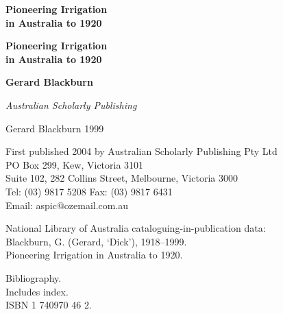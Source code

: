 \documentclass[11pt,b5paper,titlepage]{book}
\newcommand{\clearemptydoublepage}{\newpage{\pagestyle{empty}\cleardoublepage}}
\begin{document}
\frontmatter

\begin{titlepage}
\pagestyle{empty}

\begin{center}

\vspace*{60mm}

{\bfseries\sffamily\Huge Pioneering Irrigation \\[0.5ex]
in Australia to 1920}

\end{center}
\clearemptydoublepage

\begin{center}
\vspace*{30mm}

{\bfseries\sffamily\Huge Pioneering Irrigation \\[0.5ex]
in Australia to 1920}

\vspace{30mm}
{\bfseries\sffamily\huge Gerard Blackburn}

\vspace*{\fill}
{\sffamily\slshape\Large Australian Scholarly Publishing}
\end{center}
\newpage


\begin{raggedright}

\vspace*{15ex}

 Gerard Blackburn 1999

\medskip
First published 2004 by Australian Scholarly Publishing Pty Ltd\\
PO Box 299, Kew, Victoria 3101\\
Suite 102, 282 Collins Street, Melbourne, Victoria 3000\\
Tel: (03) 9817 5208 \quad Fax: (03) 9817 6431\\
Email: aspic@ozemail.com.au


\bigskip
National Library of Australia cataloguing-in-publication data:\\

\medskip
Blackburn, G. (Gerard, `Dick'), 1918--1999.\\
Pioneering Irrigation in Australia to 1920.\\
\begin{list}{}{\setlength{\topsep}{0ex}\setlength{\itemsep}{0ex}\setlength{\leftmargin}{2.5ex}}
\item
Bibliography.\\
Includes index.\\
ISBN 1 740970 46 2.


\end{list}
\end{raggedright}
\end{titlepage}
\end{document}
